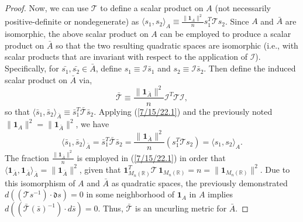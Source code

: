 \documentclass{amsart}
\numberwithin{equation}{section}
\theoremstyle{definition}
\numberwithin{theorem}{section}
\begin{document}
\begin{proof}
   Now, we can use $\mathcal{\mathcal{T}}$ to define a scalar product on $A$ (not necessarily positive-definite or nondegenerate) as $\langle s_1,s_2\rangle_A \equiv  \frac{\|\mathbf{1}_{A}\|^2}{n}s_1^T \mathcal{\mathcal{T}} s_2$. 
    Since $A$ and $\bar{A}$ are isomorphic, the above scalar product on $A$ can be employed to produce a scalar product on $\bar{A}$ so that the two resulting quadratic spaces are isomorphic (i.e., with scalar products that are invariant with respect to the application of $\mathcal{I}$).  Specifically, for $\bar{s_1},\bar{s_2}\in\bar{A}$, define $s_1 \equiv \mathcal{I}\bar{s}_1$ and $s_2 \equiv \mathcal{I}\bar{s}_2$.  Then define the induced scalar product on $\bar{A}$ via, \begin{equation}\label{7/15/22.1} \bar{\mathcal{\mathcal{T}}} \equiv  \frac{\|\mathbf{1}_{\bar{A}}\|^2}{n}\mathcal{I}^T\mathcal{\mathcal{T}}\mathcal{I},\end{equation} so that $\langle \bar{s}_1,\bar{s}_2\rangle_{\bar{A}} \equiv \bar{s}_1^T \bar{\mathcal{\mathcal{T}}} \bar{s}_2$.  Applying (\ref{7/15/22.1}) and the previously noted $\|\mathbf{1}_A\|^2 = \|\mathbf{1}_{\bar{A}}\|^2$, we have \begin{equation}\label{8/25/22.1} \langle \bar{s}_1,\bar{s}_2\rangle_{\bar{A}} = \bar{s}_1^T \bar{\mathcal{T}} \bar{s}_2 = \frac{\|\mathbf{1}_{\bar{A}}\|^2}{n}( s_1^T \mathcal{T} s_2) = \langle s_1,s_2\rangle_{A}.\end{equation}  The fraction $\frac{\|\mathbf{1}_{\bar{A}}\|^2}{n}$ is employed in (\ref{7/15/22.1}) in order that $\langle \mathbf{1}_{\bar{A}},\mathbf{1}_{\bar{A}}\rangle_{\bar{A}} = \|\mathbf{1}_{\bar{A}}\|^2$, given that $\mathbf{1}_{M_n(\mathbb{R})}^T \mathcal{T}\,\mathbf{1}_{M_n(\mathbb{R})} = n = \|\mathbf{1}_{M_n(\mathbb{R})}\|^2$. Due to this isomorphism of $A$ and $\bar{A}$ as quadratic spaces, the previously demonstrated $d((\mathcal{T}s^{-1})\cdot \mathfrak{d}s) = 0$ in some neighborhood of $\mathbf{1}_A$ in $A$ implies 
\mbox{$d((\bar{\mathcal{T}}(\bar{s})^{-1})\cdot d\bar{s}) = 0$.} Thus, $\bar{\mathcal{T}}$ is an uncurling metric for $\bar{A}$.



\end{proof}
\end{document}
